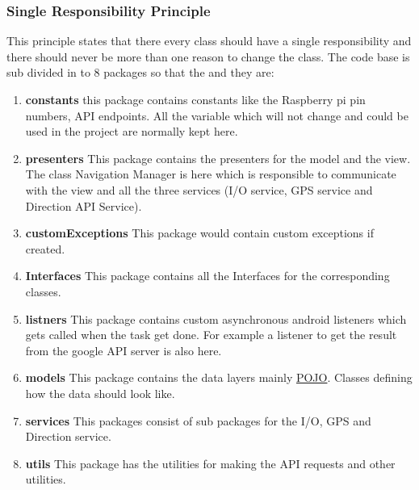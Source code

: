        \subsubsection{Single Responsibility Principle}
        This principle states that there every class should have a single responsibility
        and there should never be more than one reason to change the class. 
        The code base is sub divided in to 8 packages so that the  and they are:
        \newpage
        \begin{enumerate}
            \item 
                \textbf{constants} 
                    this package contains constants like the Raspberry pi pin 
                    numbers, API endpoints. All the variable which will not 
                    change and could be used in the project are normally kept here.
            \item 
                \textbf{presenters} 
                    This package contains the presenters for the model and the view.
                    The class Navigation Manager is here which is responsible to communicate
                    with the view and all the three services (I/O service, GPS service and 
                    Direction API Service).  
            \item 
                \textbf{customExceptions}
                    This package would contain custom exceptions if created.
            \item 
                \textbf{Interfaces}
                    This package contains all the Interfaces for the corresponding classes. 
            \item 
                \textbf{listners}
                    This package contains custom asynchronous android listeners which gets 
                    called when the task get done. For example a listener to get the result
                    from the google API server is also here. 
            \item 
                \textbf{models}
                This package contains the data layers mainly 
                \href{https://spring.io/understanding/POJO}  {POJO}. Classes defining how the
                data should look like.
            \item 
                \textbf{services} 
                    This packages consist of sub packages for the I/O, GPS and Direction service.
            \item 
                \textbf{utils}
                    This package has the utilities for making the API requests and other utilities. 
        \end{enumerate}

